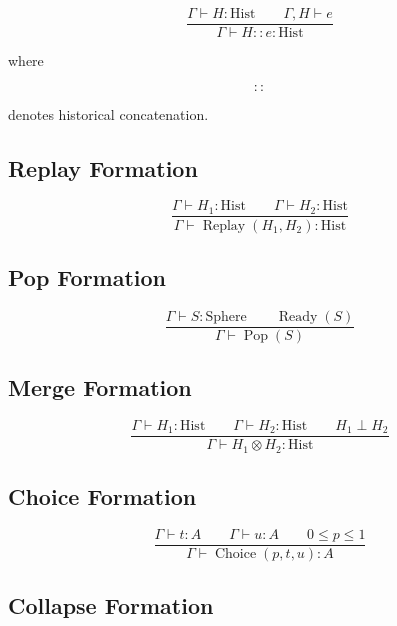 \documentclass[12pt,oneside]{article}
\theoremstyle{definition}
\theoremstyle{remark}
\begin{document}
\[
\frac
{\Gamma\vdash H:\mathrm{Hist}
\qquad
\Gamma,H\vdash e}
{\Gamma\vdash
H::e
:
\mathrm{Hist}}
\]

where

\[
::
\]

denotes historical concatenation.

\subsection*{Replay Formation}

\[
\frac
{\Gamma\vdash
H_1:\mathrm{Hist}
\qquad
\Gamma\vdash
H_2:\mathrm{Hist}}
{\Gamma\vdash
\operatorname{Replay}(H_1,H_2)
:
\mathrm{Hist}}
\]

\subsection*{Pop Formation}

\[
\frac
{\Gamma\vdash
S:\mathrm{Sphere}
\qquad
\operatorname{Ready}(S)}
{\Gamma\vdash
\operatorname{Pop}(S)}
\]

\subsection*{Merge Formation}

\[
\frac
{\Gamma\vdash
H_1:\mathrm{Hist}
\qquad
\Gamma\vdash
H_2:\mathrm{Hist}
\qquad
H_1\perp H_2}
{\Gamma\vdash
H_1\otimes H_2
:
\mathrm{Hist}}
\]

\subsection*{Choice Formation}

\[
\frac
{\Gamma\vdash t:A
\qquad
\Gamma\vdash u:A
\qquad
0\le p\le1}
{\Gamma\vdash
\operatorname{Choice}(p,t,u):A}
\]

\subsection*{Collapse Formation}
\end{document}
